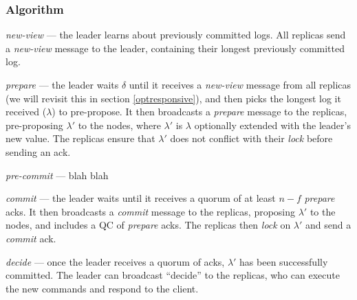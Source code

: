 \subsubsection{Algorithm}
\textit{new-view} --- the leader learns about previously committed logs. All replicas send a \textit{new-view} message to the leader, containing their longest previously committed log.

\textit{prepare} --- the leader waits $\delta$ until it receives a \textit{new-view} message from all replicas (we will revisit this in section \ref{optresponsive}), and then picks the longest log it received ($\lambda$) to pre-propose. It then broadcasts a \textit{prepare} message to the replicas, pre-proposing $\lambda'$ to the nodes, where $\lambda'$ is $\lambda$ optionally extended with the leader's new value. The replicas ensure that $\lambda'$ does not conflict with their \textit{lock} before sending an ack.

\textit{pre-commit} --- blah blah

\textit{commit} --- the leader waits until it receives a quorum of at least $n - f$ \textit{prepare} acks. It then broadcasts a \textit{commit} message to the replicas, proposing $\lambda'$ to the nodes, and includes a QC of \textit{prepare} acks. The replicas then \textit{lock} on $\lambda'$ and send a \textit{commit} ack.

\textit{decide} --- once the leader receives a quorum of acks, $\lambda'$ has been successfully committed. The leader can broadcast ``decide'' to the replicas, who can execute the new commands and respond to the client.

